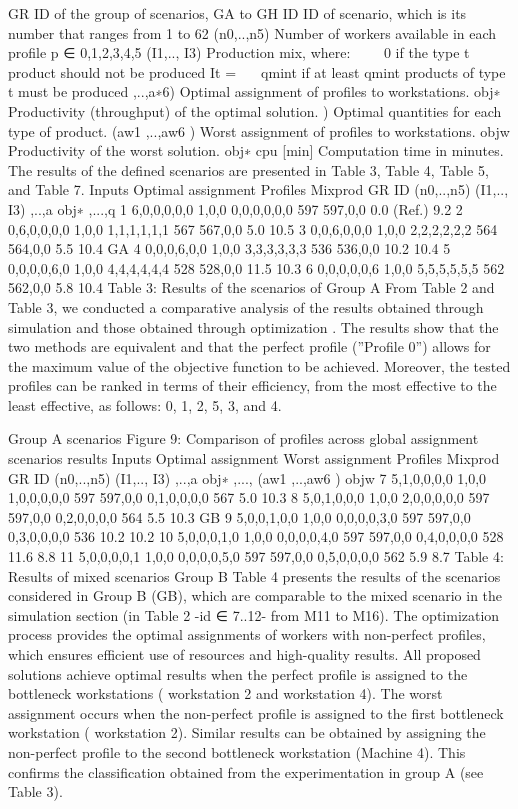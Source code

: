 GR	ID of the group of scenarios, GA to GH
ID	ID of scenario, which is its number that ranges from 1 to 62
(n0,..,n5)	Number of workers available in each profile p ∈ {0,1,2,3,4,5}
(I1,.., I3)	Production mix, where:

 0 if the type t product should not be produced It =
	 qmint	if at least qmint	products of type t must be produced
 ,..,a∗6)	Optimal assignment of profiles to workstations. obj∗	Productivity (throughput) of the optimal solution.
	 )	Optimal quantities for each type of product.
(aw1 ,..,aw6 )	Worst assignment of profiles to workstations.
objw	Productivity of the worst solution.
obj∗
cpu [min]	Computation time in minutes.
The results of the defined scenarios are presented in Table 3, Table 4, Table 5, and Table 7.
		Inputs	Optimal assignment		
		Profiles	Mixprod			
GR	ID	(n0,..,n5)	(I1,.., I3)	 ,..,a 	obj∗	 ,...,q 	%
	1	6,0,0,0,0,0	1,0,0	0,0,0,0,0,0	597	597,0,0	0.0 (Ref.)	9.2
	2	0,6,0,0,0,0	1,0,0	1,1,1,1,1,1	567	567,0,0	5.0	10.5
	3	0,0,6,0,0,0	1,0,0	2,2,2,2,2,2	564	564,0,0	5.5	10.4
GA	4	0,0,0,6,0,0	1,0,0	3,3,3,3,3,3	536	536,0,0	10.2	10.4
	5	0,0,0,0,6,0	1,0,0	4,4,4,4,4,4	528	528,0,0	11.5	10.3
	6	0,0,0,0,0,6	1,0,0	5,5,5,5,5,5	562	562,0,0	5.8	10.4
Table 3: Results of the scenarios of Group A
From Table 2 and Table 3, we conducted a comparative analysis of the results obtained through simulation and those obtained through optimization . The results show that the two methods are equivalent and that the perfect profile (”Profile 0”) allows for the maximum value of the objective function to be achieved. Moreover, the tested profiles can be ranked in terms of their efficiency, from the most effective to the least effective, as follows: 0, 1, 2, 5, 3, and 4.
 
Group A scenarios
Figure 9: Comparison of profiles across global assignment scenarios results
		Inputs	Optimal assignment	Worst assignment		
		Profiles	Mixprod				
GR	ID	(n0,..,n5)	(I1,.., I3)	 ,..,a 	obj∗	 ,..., 	(aw1 ,..,aw6 )	objw	%
	7	5,1,0,0,0,0	1,0,0	1,0,0,0,0,0	597	597,0,0	0,1,0,0,0,0	567	5.0	10.3
	8	5,0,1,0,0,0	1,0,0	2,0,0,0,0,0	597	597,0,0	0,2,0,0,0,0	564	5.5	10.3
GB	9	5,0,0,1,0,0	1,0,0	0,0,0,0,3,0	597	597,0,0	0,3,0,0,0,0	536	10.2	10.2
	10	5,0,0,0,1,0	1,0,0	0,0,0,0,4,0	597	597,0,0	0,4,0,0,0,0	528	11.6	8.8
	11	5,0,0,0,0,1	1,0,0	0,0,0,0,5,0	597	597,0,0	0,5,0,0,0,0	562	5.9	8.7
Table 4: Results of mixed scenarios Group B
Table 4 presents the results of the scenarios considered in Group B (GB), which are comparable
to the mixed scenario in the simulation section (in Table 2 -id ∈ {7..12}- from M11 to M16). The optimization process provides the optimal assignments of workers with non-perfect profiles, which ensures efficient use of resources and high-quality results.
All proposed solutions achieve optimal results when the perfect profile is assigned to the bottleneck workstations ( workstation 2 and workstation 4). The worst assignment occurs when the non-perfect profile is assigned to the first bottleneck workstation ( workstation 2). Similar results can be obtained by assigning the non-perfect profile to the second bottleneck workstation (Machine 4). This confirms the classification obtained from the experimentation in group A (see Table 3).
 
